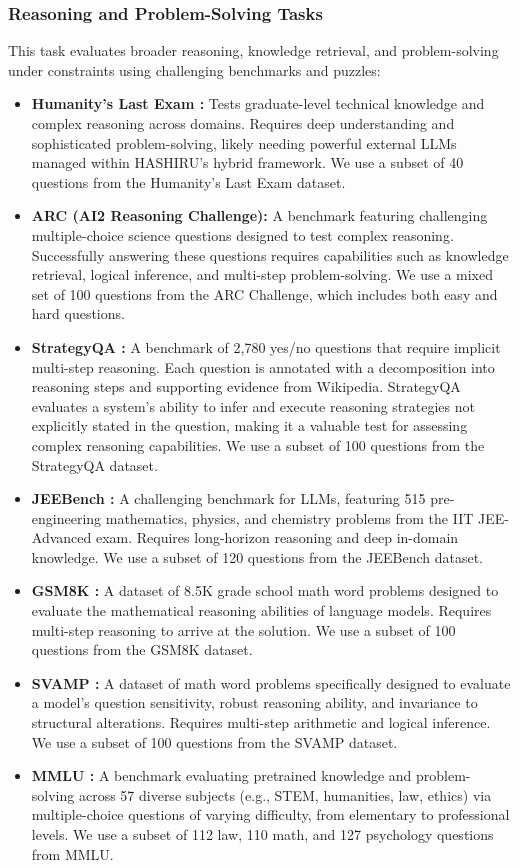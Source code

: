 \documentclass[conference]{IEEEtran}
\begin{document}
\subsubsection{Reasoning and Problem-Solving Tasks}
This task evaluates broader reasoning, knowledge retrieval, and problem-solving under constraints using challenging benchmarks and puzzles:
\begin{itemize}
    \item \textbf{Humanity's Last Exam \cite{phan2025humanitysexam}:} Tests graduate-level technical knowledge and complex reasoning across domains. Requires deep understanding and sophisticated problem-solving, likely needing powerful external LLMs managed within HASHIRU's hybrid framework.
    We use a subset of 40 questions from the Humanity's Last Exam dataset.
    \item \textbf{ARC (AI2 Reasoning Challenge)\cite{boratko2018systematic}:} A benchmark featuring challenging multiple-choice science questions designed to test complex reasoning. Successfully answering these questions requires capabilities such as knowledge retrieval, logical inference, and multi-step problem-solving.
    We use a mixed set of 100 questions from the ARC Challenge, which includes both easy and hard questions.
    \item \textbf{StrategyQA \cite{geva2021strategyqa}:} A benchmark of 2,780 yes/no questions that require implicit multi-step reasoning. Each question is annotated with a decomposition into reasoning steps and supporting evidence from Wikipedia. StrategyQA evaluates a system's ability to infer and execute reasoning strategies not explicitly stated in the question, making it a valuable test for assessing complex reasoning capabilities.
    We use a subset of 100 questions from the StrategyQA dataset.
    \item \textbf{JEEBench \cite{arora-etal-2023-llms}:} A challenging benchmark for LLMs, featuring 515 pre-engineering mathematics, physics, and chemistry problems from the IIT JEE-Advanced exam. Requires long-horizon reasoning and deep in-domain knowledge. 
    We use a subset of 120 questions from the JEEBench dataset.
    \item \textbf{GSM8K \cite{cobbe2021gsm8k}:} A dataset of 8.5K grade school math word problems designed to evaluate the mathematical reasoning abilities of language models. Requires multi-step reasoning to arrive at the solution.
    We use a subset of 100 questions from the GSM8K dataset.
    \item \textbf{SVAMP \cite{patel2021nlp}:} A dataset of math word problems specifically designed to evaluate a model's question sensitivity, robust reasoning ability, and invariance to structural alterations. Requires multi-step arithmetic and logical inference.
    We use a subset of 100 questions from the SVAMP dataset.
    \item \textbf{MMLU \cite{hendrycks2021measuringmassivemultitasklanguage}:} A benchmark evaluating pretrained knowledge and problem-solving across 57 diverse subjects (e.g., STEM, humanities, law, ethics) via multiple-choice questions of varying difficulty, from elementary to professional levels.
    We use a subset of 112 law, 110 math, and 127 psychology questions from MMLU.
\end{itemize}
\end{document}
